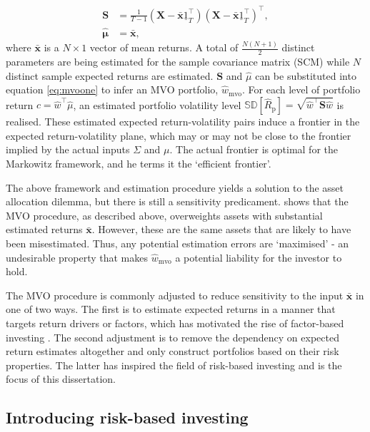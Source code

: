 \documentclass[
]{article}
\begin{document}
\begin{align}
\textbf{S}&=  \frac{1}{T - 1}(\textbf{X} - \mathbf{\bar{x}} \underline{1}^\intercal_T)(\textbf{X} - \mathbf{\bar{x}} \underline{1}^\intercal_T)^\intercal, \label{eq:samplevar} \\
\mathbf{\hat{\mu}} &= \mathbf{\bar{x}} , \label{eq:samplemean}
\end{align}
where \(\mathbf{\bar{x}}\) is a \(N \times 1\) vector of mean returns. A total of \(\frac{N(N+1)}{2}\)
distinct parameters are being estimated for the sample covariance matrix (SCM) while \(N\) distinct
sample expected returns are estimated. \(\textbf{S}\) and \(\hat{\mu}\) can be substituted into
equation \eqref{eq:mvoone} to infer an MVO portfolio, \(\hat{w}_\mathrm{mvo}\). For each level of
portfolio return \(c = \hat{w}^\intercal \hat{\mu}\), an estimated portfolio volatility level
\(\mathbb{SD}[\hat{R}_\mathrm{p}] = \sqrt{\hat{w}^\intercal\textbf{S}\hat{w}}\) is realised. These
estimated expected return-volatility pairs induce a frontier in the expected return-volatility
plane, which may or may not be close to the frontier implied by the actual inputs \(\Sigma\) and
\(\mu\). The actual frontier is optimal for the Markowitz framework, and he terms it the `efficient
frontier'.

The above framework and estimation procedure yields a solution to the asset allocation dilemma, but
there is still a sensitivity predicament. \citet{M89} shows that the MVO procedure, as described above,
overweights assets with substantial estimated returns \(\mathbf{\bar{x}}\). However, these are the
same assets that are likely to have been misestimated. Thus, any potential estimation errors are
`maximised' - an undesirable property that makes \(\hat{w}_\mathrm{mvo}\) a potential liability for
the investor to hold.

The MVO procedure is commonly adjusted to reduce sensitivity to the input \(\mathbf{\bar{x}}\) in one
of two ways. The first is to estimate expected returns in a manner that targets return drivers or
factors, which has motivated the rise of factor-based investing \citep{A14}. The second adjustment is to
remove the dependency on expected return estimates altogether and only construct portfolios based
on their risk properties. The latter has inspired the field of risk-based investing and is the
focus of this dissertation.

\hypertarget{introducing-risk-based-investing}{%
\subsection{Introducing risk-based investing}\label{introducing-risk-based-investing}}
\end{document}
